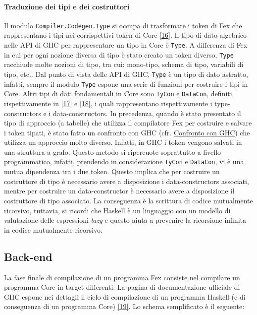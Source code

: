 \documentclass[10pt,a4paper]{article}
\begin{document}
\hypertarget{Traduzione dei tipi e dei costruttori}{\paragraph{Traduzione dei tipi e dei costruttori}}
Il modulo \texttt{Compiler.Codegen.Type} si occupa di trasformare i token di Fex che rappresentano i tipi nei
corrispettivi token di Core \hyperlink{bibl16}{[16]}. Il tipo di dato algebrico nelle API di GHC per rappresentare un tipo
in Core è \texttt{Type}. A differenza di Fex in cui per ogni nozione diversa di tipo è stato creato un token diverso,
\texttt{Type} racchiude molte nozioni di tipo, tra cui: mono-tipo, schema di tipo, variabili di tipo, etc.. Dal
punto di vista delle API di GHC, \texttt{Type} è un tipo di dato astratto, infatti, sempre il modulo \texttt{Type}
espone una serie di funzioni per costruire i tipi in Core. Altri tipi di dati fondamentali in Core sono \texttt{TyCon} e
\texttt{DataCon}, definiti rispettivamente in \hyperlink{bibl17}{[17]} e \hyperlink{bibl18}{[18]}, i quali rappresentano
rispettivamente i type-constructors e
i data-constructors. In precedenza, quando è stato presentato il tipo di approccio (a tabelle) che utilizza il
compilatore Fex
per costruire e salvare i token tipati, è stato fatto un confronto con GHC
(cfr. \hyperlink{Confronto con GHC}{Confronto con GHC}) che utilizza un
approccio molto diverso. Infatti, in GHC i token vengono salvati in una struttura a grafo. Questo metodo si
ripercuote soprattutto a livello programmatico, infatti, prendendo in considerazione \texttt{TyCon} e \texttt{DataCon},
vi è una mutua dipendenza tra i due token. Questo implica che per costruire un costruttore di tipo è
necessario avere a disposizione i data-constructors associati, mentre per costruire un data-constructor è necessario avere a
disposizione il costruttore di tipo associato. La conseguenza è la scrittura di codice mutualmente ricorsivo, tuttavia,
si ricordi che Haskell è un linguaggio con un modello di valutazione delle espressioni \textit{lazy} e questo aiuta a
prevenire la ricorsione infinita in codice mutualmente ricorsivo.

\hypertarget{Back-end}{\subsection{Back-end}}
La fase finale di compilazione di un programma Fex consiste nel compilare un programma Core in target differenti.
La pagina di documentazione ufficiale di GHC espone nei dettagli il ciclo di compilazione di un programma Haskell (e
di conseguenza di un programma Core) \hyperlink{bibl19}{[19]}. Lo schema semplificato è il seguente:
\newline
\end{document}
